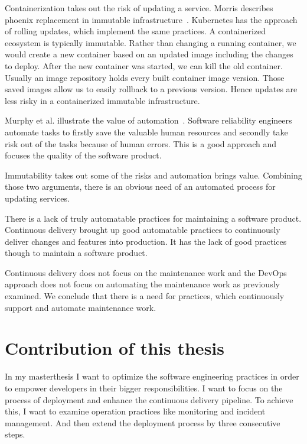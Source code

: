 Containerization takes out the risk of updating a service. Morris describes phoenix
replacement in immutable infrastructure~\cite{infra_as_code_phoenix}. Kubernetes has the
approach of rolling updates, which implement the same practices. A containerized ecosystem
is typically immutable. Rather than changing a running container, we would create a new
container based on an updated image including the changes to deploy. After the new
container was started, we can kill the old container. Usually an image repository holds
every built container image version. Those saved images allow us to easily rollback to a
previous version. Hence updates are less risky in a containerized immutable
infrastructure.

Murphy et al. illustrate the value of automation~\cite{sre_automation}. Software
reliability engineers automate tasks to firstly save the valuable human resources and
secondly take risk out of the tasks because of human errors. This is a good approach and
focuses the quality of the software product.

Immutability takes out some of the risks and automation brings value. Combining those two
arguments, there is an obvious need of an automated process for updating services.

There is a lack of truly automatable practices for maintaining a software
product. Continuous delivery brought up good automatable practices to continuously deliver
changes and features into production. It has the lack of good practices though to maintain
a software product.

Continuous delivery does not focus on the maintenance work and the DevOps approach does
not focus on automating the maintenance work as previously examined. We conclude that
there is a need for practices, which continuously support and automate maintenance work.

\section{Contribution of this thesis}

In my masterthesis I want to optimize the software engineering practices in order to
empower developers in their bigger responsibilities. I want to focus on the process of
deployment and enhance the continuous delivery pipeline. To achieve this, I want to
examine operation practices like monitoring and incident management. And then extend the
deployment process by three consecutive steps.


